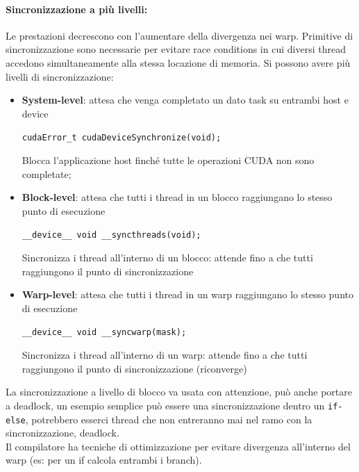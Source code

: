 \paragraph{Sincronizzazione a più livelli: } Le prestazioni decrescono con l'aumentare della divergenza nei warp. Primitive di sincronizzazione sono necessarie per evitare race conditions in cui diversi thread accedono simultaneamente alla stessa locazione di memoria. Si possono avere più livelli di sincronizzazione:
\begin{itemize}
	\item \textbf{System-level}: attesa che venga completato un dato task su entrambi host e device
	\begin{center}
		\texttt{cudaError\_t cudaDeviceSynchronize(void);}
	\end{center}
	Blocca l'applicazione host finché tutte le operazioni CUDA non sono completate;
	
	\item \textbf{Block-level}: attesa che tutti i thread in un blocco raggiungano lo stesso punto di esecuzione
	\begin{center}
		\texttt{\_\_device\_\_ void \_\_syncthreads(void);}
	\end{center}
	Sincronizza i thread all'interno di un blocco: attende fino a che tutti raggiungono il punto di sincronizzazione
	
	\item \textbf{Warp-level}: attesa che tutti i thread in un warp raggiungano lo stesso punto di esecuzione
	\begin{center}
		\texttt{\_\_device\_\_ void \_\_syncwarp(mask);}
	\end{center}
	Sincronizza i thread all'interno di un warp: attende fino a che tutti raggiungono il punto di sincronizzazione (riconverge)
\end{itemize}
La sincronizzazione a livello di blocco va usata con attenzione, può anche portare a deadlock, un esempio semplice può essere una sincronizzazione dentro un \texttt{if-else}, potrebbero esserci thread che non entreranno mai nel ramo con la sincronizzazione, deadlock.\\

Il compilatore ha tecniche di ottimizzazione per evitare divergenza all'interno del warp (es: per un if calcola entrambi i branch).\\


\newpage

